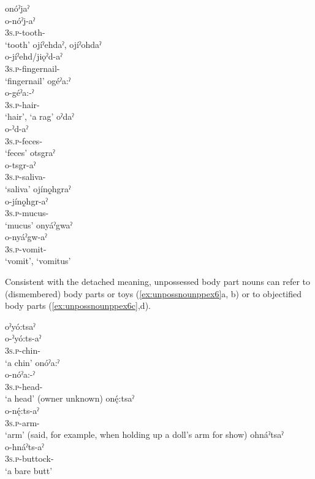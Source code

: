 \ea\label{ex:unpossnounppex4}
\ea onóˀjaˀ\\
\gll o-nóˀj-aˀ\\
 \textsc{3s.p}-tooth-{\nounstemformer}\\
\glt `tooth'
\ex ojíˀehdaˀ, ojíˀohdaˀ\\
\gll o-jíˀehd/jiǫˀd-aˀ\\
 \textsc{3s.p}-fingernail-{\nounstemformer}\\
\glt `fingernail'
\ex ogéˀa:ˀ \\
\gll o-géˀa:-ˀ\\
 \textsc{3s.p}-hair-{\nounstemformer}\\
\glt ‘hair’, `a rag'
\ex oˀdaˀ\\
\gll o-ˀd-aˀ\\
 \textsc{3s.p}-feces-{\nounstemformer}\\
\glt `feces'
\ex otsgraˀ\\
\gll o-tsgr-aˀ\\
 \textsc{3s.p}-saliva-{\nounstemformer}\\
\glt `saliva'
\ex ojínǫ̱hgraˀ\\
\gll o-jínǫ̱hgr-aˀ\\
 \textsc{3s.p}-mucus-{\nounstemformer}\\
\glt `mucus'
\ex onyáˀgwaˀ \\
\gll o-nyáˀgw-aˀ\\
 \textsc{3s.p}-vomit-{\nounstemformer}\\
\glt ‘vomit’, `vomitus'
\z
\z

Consistent with the detached meaning, unpossessed body part nouns can refer to (dismembered) body parts or toys (\ref{ex:unpossnounppex6}a, b) or to objectified body parts (\ref{ex:unpossnounppex6c},d). 

\newpage
\ea\label{ex:unpossnounppex6} 
\ea oˀyó:tsaˀ\\\label{ex:unpossnounppex6a}
\gll o-ˀyó:ts-aˀ\\
 \textsc{3s.p}-chin-{\nounstemformer}\\
\glt `a chin'
\ex onóˀa:ˀ \\\label{ex:unpossnounppex6b}
\gll o-nóˀa:-ˀ\\
\textsc{3s.p}-head-{\nounstemformer}\\
\glt ‘a head’ (owner unknown) 
\ex onę́:tsaˀ \\\label{ex:unpossnounppex6c}
\gll o-nę́:ts-aˀ \\
\textsc{3s.p}-arm-{\nounstemformer}\\
\glt ‘arm’ (said, for example, when holding up a doll’s arm for show)
\ex ohnáˀtsaˀ\\\label{ex:unpossnounppex6d}
\gll o-hnáˀts-aˀ\\
 \textsc{3s.p}-buttock-{\nounstemformer}\\
\glt `a bare butt'
\z
\z


